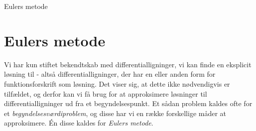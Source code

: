 
\begin{center}
	\Huge
	Eulers metode
\end{center}
\section*{Eulers metode}

Vi har kun stiftet bekendtskab med differentialligninger, vi kan finde en eksplicit løsning til - altså differentialligninger, der har en eller anden form for funktionsforskrift som løsning. Det viser sig, at dette ikke nødvendigvis er tilfældet, og derfor kan vi få brug for at approksimere løsninger til differentialligninger ud fra et begyndelsespunkt. Et sådan problem kaldes ofte for et \textit{begyndelsesværdiproblem}, og disse har vi en række forskellige måder at approksimere. Én disse kaldes for \textit{Eulers metode}.

